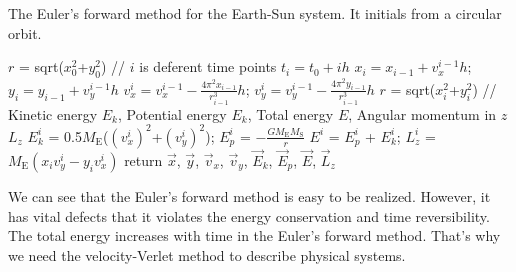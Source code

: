 \begin{algorithm}[tb]
	\caption{The Euler's forward method for the Earth-Sun system. It initials from a circular orbit.}
	\label{alg::euler}
	$r$ = sqrt($x_0^2$+$y_0^2$)\;
	// $i$ is deferent time points $t_i=t_0+ih$\;
    { $x_{i} = x_{i-1} + v_x^{{i-1}}h$;
    $y_{i} = y_{i-1} + v_y^{{i-1}}h$\;
    $v_x^{i} = v_x^{i-1} - \frac{4\pi^2x_{i-1}}{r_{i-1}^3}h$;
    $v_y^{i} = v_y^{i-1} - \frac{4\pi^2y_{i-1}}{r_{i-1}^3}h$\;
    $r$ = sqrt($x_i^2$+$y_i^2$)\;
    // Kinetic energy $E_k$, Potential energy $E_k$, Total energy $E$, Angular momentum in $\hat{z}$ $L_z$\;
    $E_k^i$ = 0.5$M_{\mathrm{E}}$($(v_x^{i})^2$+$(v_y^{i})^2$);
    $E_p^i$ = $-\frac{GM_{\mathrm{E}}M_{\mathrm{S}}}{r}$\;
    $E^i$ = $E_p^i$ + $E_k^i$;
    $L_z^i$ = $M_{\mathrm{E}}(x_iv_y^{i}-y_iv_x^{i})$\;
    }
	return $\vec{x}$, $\vec{y}$, $\vec{v}_x$, $\vec{v}_y$, $\vec{E}_k$, $\vec{E}_p$, $\vec{E}$, $\vec{L}_z$\;
\end{algorithm}

We can see that the Euler's forward method is easy to be realized.
 However, it has vital defects that it violates the energy conservation and time reversibility.
 The total energy increases with time in the Euler's forward method.
 That's why we need the velocity-Verlet method to describe physical systems.
